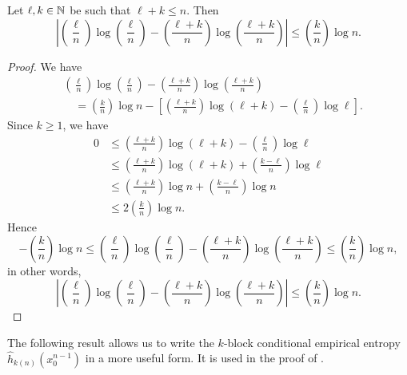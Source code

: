 \begin{proposition}\label{prop:logs-thm-4-1}
	Let $\ell, k \in \mathbb{N}$ be such that $\ell + k \leq n$. Then
	\[
		\left|\left(\frac{\ell}{n}\right)\log\left(\frac{\ell}{n}\right) - \left(\frac{\ell + k}{n}\right)\log\left(\frac{\ell + k}{n}\right)\right| \leq \left(\frac{k}{n}\right)\log{n}.
	\]
	
	\begin{proof}
		We have
		\begin{align*}
			&\left(\frac{\ell}{n}\right)\log\left(\frac{\ell}{n}\right) - \left(\frac{\ell + k}{n}\right)\log\left(\frac{\ell + k}{n}\right) \\
				&\quad = \left(\frac{k}{n}\right)\log{n} - \left[\left(\frac{\ell + k}{n}\right)\log(\ell + k) - \left(\frac{\ell}{n}\right)\log{\ell}\right].
		\end{align*}
		Since $k \geq 1$, we have
		\begin{align*}
			0 &\leq \left(\frac{\ell + k}{n}\right)\log(\ell + k) - \left(\frac{\ell}{n}\right)\log{\ell} \\
				&\leq \left(\frac{\ell + k}{n}\right)\log(\ell + k) + \left(\frac{k - \ell}{n}\right)\log{\ell} \\
				&\leq \left(\frac{\ell + k}{n}\right)\log{n} + \left(\frac{k - \ell}{n}\right)\log{n} \\
				&\leq 2\left(\frac{k}{n}\right)\log{n}.
		\end{align*}
		Hence
		\[
			-\left(\frac{k}{n}\right)\log{n} \leq \left(\frac{\ell}{n}\right)\log\left(\frac{\ell}{n}\right) - \left(\frac{\ell + k}{n}\right)\log\left(\frac{\ell + k}{n}\right) \leq \left(\frac{k}{n}\right)\log{n},
		\]
		in other words,
		\[
			\left|\left(\frac{\ell}{n}\right)\log\left(\frac{\ell}{n}\right) - \left(\frac{\ell + k}{n}\right)\log\left(\frac{\ell + k}{n}\right)\right| \leq \left(\frac{k}{n}\right)\log{n}.
		\]
	\end{proof}
\end{proposition}

The following result allows us to write the $k$-block conditional empirical entropy $\hat{h}_{k(n)}(x_0^{n - 1})$ in a more useful form. It is used in the proof of .

